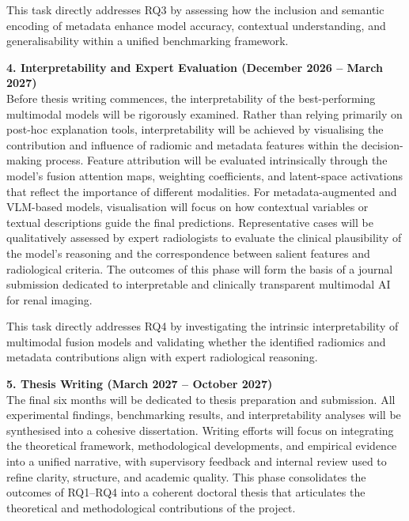 \documentclass[final,british,a4paper,12pt]{phdthesis}
\begin{document}
This task directly addresses RQ3 by assessing how the inclusion and semantic encoding of metadata enhance model accuracy, contextual understanding, and generalisability within a unified benchmarking framework.

\textbf{4. Interpretability and Expert Evaluation (December 2026 – March 2027)}\\
Before thesis writing commences, the interpretability of the best-performing multimodal models will be rigorously examined. 
Rather than relying primarily on post-hoc explanation tools, interpretability will be achieved by visualising the contribution and influence of radiomic and metadata features within the decision-making process. 
Feature attribution will be evaluated intrinsically through the model’s fusion attention maps, weighting coefficients, and latent-space activations that reflect the importance of different modalities. 
For metadata-augmented and VLM-based models, visualisation will focus on how contextual variables or textual descriptions guide the final predictions. 
Representative cases will be qualitatively assessed by expert radiologists to evaluate the clinical plausibility of the model’s reasoning and the correspondence between salient features and radiological criteria. 
The outcomes of this phase will form the basis of a journal submission dedicated to interpretable and clinically transparent multimodal AI for renal imaging. 

This task directly addresses RQ4 by investigating the intrinsic interpretability of multimodal fusion models and validating whether the identified radiomics and metadata contributions align with expert radiological reasoning.

\textbf{5. Thesis Writing (March 2027 – October 2027)}\\
The final six months will be dedicated to thesis preparation and submission. All experimental findings, benchmarking results, and interpretability analyses will be synthesised into a cohesive dissertation. Writing efforts will focus on integrating the theoretical framework, methodological developments, and empirical evidence into a unified narrative, with supervisory feedback and internal review used to refine clarity, structure, and academic quality. This phase consolidates the outcomes of RQ1–RQ4 into a coherent doctoral thesis that articulates the theoretical and methodological contributions of the project.





\end{document}
